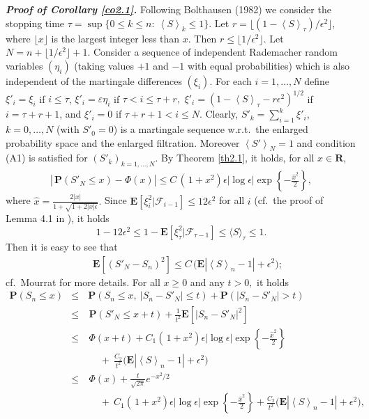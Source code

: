 \documentclass{gSTA2e}
\theoremstyle{plain}
\theoremstyle{definition}
\theoremstyle{remark}
\begin{document}
\vspace{0.3cm}
\noindent\emph{\textbf{Proof of Corollary \ref{co2.1}.}}
Following Bolthausen (1982) we consider the stopping time
$\tau=\sup\{0\leq k\leq n:\ \left\langle S\right\rangle_k \leq 1\}$.
Let $r= \lfloor (1- \left\langle S\right\rangle_\tau)/\epsilon^2 \rfloor$, where $\lfloor x\rfloor$ is the largest integer less than $x$.
Then $r\leq \lfloor 1/\epsilon^2 \rfloor $. Let  $N=n+\lfloor 1/\epsilon^2 \rfloor +1.$
Consider a sequence of independent Rademacher random variables $(\eta_i)$ (taking values $+1$ and $-1$ with equal probabilities)
which is also independent of the martingale differences $(\xi_i)$.
For each $i=1,\dots,N$ define $\xi'_i =\xi_i$ if $i \leq \tau$, $\xi'_i =\varepsilon \eta_i$ if $\tau < i \leq \tau+r,$
$\xi'_{i}=(1-\left\langle S\right\rangle_\tau -r \epsilon^2 )^{1/2}$  if $i=\tau +r +1$, and $\xi'_i=0$ if $\tau +r +1 < i \leq N.$
Clearly, $S'_k=\sum_{i=1}^k \xi'_{i}$, $k=0,\dots,N$ (with $S'_0=0$) is a martingale sequence w.r.t.~the enlarged probability space and the enlarged filtration.
Moreover $\left\langle S'\right\rangle_{N}=1$  and condition (A1) is satisfied for $(S'_k)_{k=1,\dots,N}.$
By Theorem  \ref{th2.1}, it holds, for all $x \in \mathbf{R}$,
\begin{eqnarray}
  \left|\frac{}{} \mathbf{P}(S'_N  \leq x )-  \Phi\left( x\right) \right|   \leq   C\,\left(\frac{}{}\! 1+ x^2 \right)\epsilon|\log \epsilon|   \exp\left\{-\frac{\widehat{x}^2}{2}\right\} ,
\end{eqnarray}
where $\widehat{x}   = \frac{2|x| }{1+\sqrt{1+2|x|\epsilon }}.$  Since $\mathbf{E}[\xi_i^2 | \mathcal{F}_{i-1}] \leq 12 \epsilon^2$ for all $i$ (cf.\ the proof of Lemma 4.1 in \cite{FGL13}), it holds $$ 1- 12 \epsilon^2 \leq 1-\mathbf{E}[\xi_\tau^2 | \mathcal{F}_{\tau-1}] \leq \langle S\rangle_\tau \leq 1.$$ Then it is easy to see that
 \begin{eqnarray}
\ \ \ \ \ \  \mathbf{E}[(S'_N -S_n )^2]  \leq C \, \Big(\mathbf{E} |\! \left\langle S\right\rangle_n -1| + \epsilon^2 \Big);
 \end{eqnarray}
cf.\ Mourrat \cite{M13} for more details.   For all  $x\geq 0$ and  any $t>0,$ it holds
 \begin{eqnarray}
   \mathbf{P}(S_n \leq x ) &\leq&  \frac{}{} \mathbf{P}(S_n \leq x,\ |S_n-S'_N | \leq t  ) +  \mathbf{P}(|S_n-S'_N| > t   )  \label{chi78}\\
    &\leq&\ \mathbf{P}(S'_N \leq x+ t  ) + \frac{1}{t^2} \mathbf{E} [ |S_n-S'_N|^2 ]  \label{chineqd}\\
    &\leq&\ \Phi\left( x+t\right)  + C_1 \left(\frac{}{}\! 1+ x^2 \right)\epsilon|\log \epsilon|   \exp\left\{-\frac{\widehat{x}^2}{2}\right\}
    \nonumber \\ &&\ \ \ \ \ \   + \ \frac{ C_2}{t^2} \Big(\mathbf{E}|\! \left\langle S\right\rangle_n -1| + \epsilon^2 \Big)  \nonumber \\
     &\leq&\ \Phi\left( x \right) +\frac{t}{\sqrt{2\pi}}e^{- x^2/2} \nonumber \\
      && \ \ \ \ \ \  + \  C_1 \left(\frac{}{}\! 1+ x^2 \right)\epsilon|\log \epsilon|   \exp\left\{-\frac{\widehat{x}^2}{2}\right\}  + \frac{ C_2}{t^2}
      \Big(\mathbf{E} |\! \left\langle S\right\rangle_n -1| + \epsilon^2 \Big),  \nonumber
\end{eqnarray}
\end{document}
